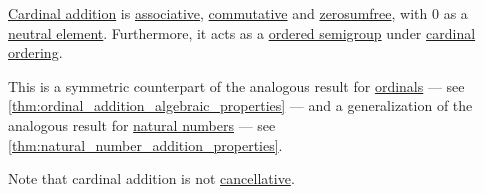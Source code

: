 \begin{proposition}\label{thm:cardinal_addition_algebraic_properties}
  \hyperref[def:cardinal_addition]{Cardinal addition} is \hyperref[def:binary_operation/associative]{associative}, \hyperref[def:binary_operation/associative]{commutative} and \hyperref[def:zerosumfree]{zerosumfree}, with \( 0 \) as a \hyperref[def:semigroup_neutral_element]{neutral element}. Furthermore, it acts as a \hyperref[def:ordered_semigroup]{ordered semigroup} under \hyperref[def:cardinal_ordering]{cardinal ordering}.
\end{proposition}
\begin{comments}
  \item This is a symmetric counterpart of the analogous result for \hyperref[def:ordinal]{ordinals} --- see \cref{thm:ordinal_addition_algebraic_properties} --- and a generalization of the analogous result for \hyperref[def:natural_numbers]{natural numbers} --- see \cref{thm:natural_number_addition_properties}.

  \item Note that cardinal addition is not \hyperref[def:binary_operation/cancellative]{cancellative}.
\end{comments}
